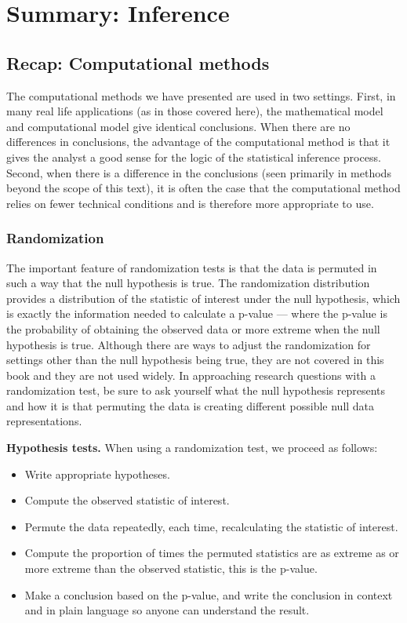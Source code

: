 \documentclass[
  10pt,
  openany]{book}
\begin{document}
\hypertarget{inference-applications}{%
\chapter{Summary: Inference}\label{inference-applications}}

\hypertarget{comp-methods-summary}{%
\section{Recap: Computational methods}\label{comp-methods-summary}}

The computational methods we have presented are used in two settings.
First, in many real life applications (as in those covered here), the mathematical model and computational model give identical conclusions.
When there are no differences in conclusions, the advantage of the computational method is that it gives the analyst a good sense for the logic of the statistical inference process.
Second, when there is a difference in the conclusions (seen primarily in methods beyond the scope of this text), it is often the case that the computational method relies on fewer technical conditions and is therefore more appropriate to use.

\hypertarget{randomization}{%
\subsection{Randomization}\label{randomization}}

The important feature of randomization tests is that the data is permuted in such a way that the null hypothesis is true.
The randomization distribution provides a distribution of the statistic of interest under the null hypothesis, which is exactly the information needed to calculate a p-value --- where the p-value is the probability of obtaining the observed data or more extreme when the null hypothesis is true.
Although there are ways to adjust the randomization for settings other than the null hypothesis being true, they are not covered in this book and they are not used widely.
In approaching research questions with a randomization test, be sure to ask yourself what the null hypothesis represents and how it is that permuting the data is creating different possible null data representations.

\textbf{Hypothesis tests.} When using a randomization test, we proceed as follows:

\begin{itemize}
\item
  Write appropriate hypotheses.
\item
  Compute the observed statistic of interest.
\item
  Permute the data repeatedly, each time, recalculating the statistic of interest.
\item
  Compute the proportion of times the permuted statistics are as extreme as or more extreme than the observed statistic, this is the p-value.
\item
  Make a conclusion based on the p-value, and write the conclusion in context and in plain language so anyone can understand the result.
\end{itemize}
\end{document}

